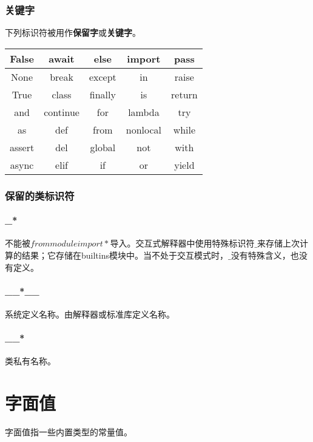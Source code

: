 \documentclass[10pt,UTF8]{ctexart}
\begin{document}
\subsubsection{关键字}
下列标识符被用作\textbf{保留字}或\textbf{关键字}。\\
\begin{center}
\begin{tabular}{ccccc}
\hline 
False & await & else & import & pass \\ 
\hline 
None & break & except & in & raise \\ 
\hline 
True & class & finally & is & return \\ 
\hline 
and & continue & for & lambda & try \\ 
\hline 
as & def & from & nonlocal & while \\ 
\hline 
assert & del & global & not & with \\ 
\hline 
async & elif & if & or & yield \\ 
\hline 
\end{tabular}
\end{center}
\subsubsection{保留的类标识符}
\paragraph{\_*}不能被\textbf{$from module import *$}导入。交互式解释器中使用特殊标识符$\_$来存储上次计算的结果；它存储在builtins模块中。当不处于交互模式时，$\_$没有特殊含义，也没有定义。
\paragraph{\_\_*\_\_}系统定义名称。由解释器或标准库定义名称。
\paragraph{\_\_*}类私有名称。
\section{字面值}
字面值指一些内置类型的常量值。
\end{document}
